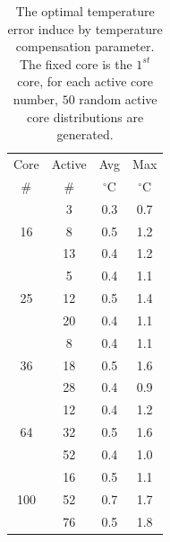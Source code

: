 \begin{table}
  \caption{The optimal temperature error induce by temperature compensation parameter. The fixed core is the $1^{st}$ core, for each active core number, $50$ random active core distributions are generated.}
  \label{tab:opt_tem}
  \centering
  \begin{tabular}{c|c|c|c}
    \hline
    Core & Active     &  Avg  &   Max  \\
    \#       &   \#       &  $^{\circ}$C    & $^{\circ}$C  \\
     \hline
\hline
   \multirow{3}{*}{16} &      3        &   0.3 &   0.7    \\   
             &      8       &    0.5     &  1.2     \\
             &      13     &     0.4    &   1.2   \\
     \hline
  \multirow{3}{*}{25} &      5       &    0.4 & 1.1      \\ 
              &     12      &    0.5     &    1.4     \\
              &     20      &    0.4     &    1.1     \\ 
     \hline
  \multirow{3}{*}{36}  &     8        &    0.4  &    1.1  \\
              &     18      &   0.5      &   1.6     \\
              &     28      &    0.4     &   0.9  \\
     \hline
  \multirow{3}{*}{64}  &     12      &   0.4  &   1.2  \\
              &     32      &    0.5     &     1.6       \\
              &     52      &     0.4   &     1.0    \\
 \hline 
\multirow{3}{*}{100}  & 16 & 	 0.5&	1.1\\
                      & 52 &	 0.7&	1.7\\
                      & 76 &	 0.5&	1.8\\
\hline
\end{tabular}
\end{table}



